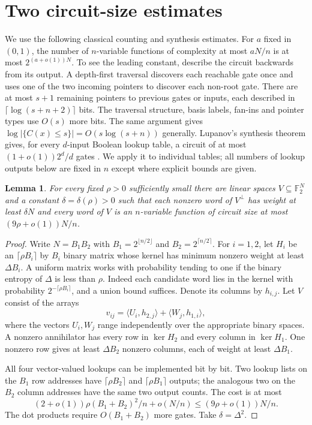 \documentclass[11pt]{article}
\newtheorem{lemma}[theorem]{Lemma}
\newcommand{\F}{\mathbb F_2}
\begin{document}
\section{Two circuit-size estimates}

We use the following classical counting and synthesis estimates. For $a$ fixed in $(0,1)$, the number of $n$-variable functions of complexity at most $aN/n$ is at most $2^{(a+o(1))N}$. To see the leading constant, describe the circuit backwards from its output. A depth-first traversal discovers each reachable gate once and uses one of the two incoming pointers to discover each non-root gate. There are at most $s+1$ remaining pointers to previous gates or inputs, each described in $\lceil\log(s+n+2)\rceil$ bits. The traversal structure, basis labels, fan-ins and pointer types use $O(s)$ more bits. The same argument gives $\log|\{C(x)\le s\}|=O(s\log(s+n))$ generally. Lupanov's synthesis theorem gives, for every $d$-input Boolean lookup table, a circuit of at most $(1+o(1))2^d/d$ gates \cite{lup}. We apply it to individual tables; all numbers of lookup outputs below are fixed in $n$ except where explicit bounds are given.

\begin{lemma}\label{l:prod}
For every fixed $\rho>0$ sufficiently small there are linear spaces $V\subseteq\F^N$ and a constant $\delta=\delta(\rho)>0$ such that each nonzero word of $V^\perp$ has weight at least $\delta N$ and every word of $V$ is an $n$-variable function of circuit size at most $(9\rho+o(1))N/n$.
\end{lemma}
\begin{proof}
Write $N=B_1 B_2$ with $B_1=2^{\lfloor n/2\rfloor}$ and $B_2=2^{\lceil n/2\rceil}$. For $i=1,2$, let $H_i$ be an $\lceil\rho B_i\rceil$ by $B_i$ binary matrix whose kernel has minimum nonzero weight at least $\Delta B_i$. A uniform matrix works with probability tending to one if the binary entropy of $\Delta$ is less than $\rho$. Indeed each candidate word lies in the kernel with probability $2^{-\lceil\rho B_i\rceil}$, and a union bound suffices. Denote its columns by $h_{i,j}$. Let $V$ consist of the arrays
\[
 v_{ij}=\langle U_i,h_{2,j}\rangle+\langle W_j,h_{1,i}\rangle,
\]
where the vectors $U_i,W_j$ range independently over the appropriate binary spaces. A nonzero annihilator has every row in $\ker H_2$ and every column in $\ker H_1$. One nonzero row gives at least $\Delta B_2$ nonzero columns, each of weight at least $\Delta B_1$.

All four vector-valued lookups can be implemented bit by bit. Two lookup lists on the $B_1$ row addresses have $\lceil\rho B_2\rceil$ and $\lceil\rho B_1\rceil$ outputs; the analogous two on the $B_2$ column addresses have the same two output counts. The cost is at most
\[
 (2+o(1))\rho(B_1+B_2)^2/n +o(N/n)
 \le(9\rho+o(1))N/n.
\]
The dot products require $O(B_1+B_2)$ more gates. Take $\delta=\Delta^2$.
\end{proof}
\end{document}

